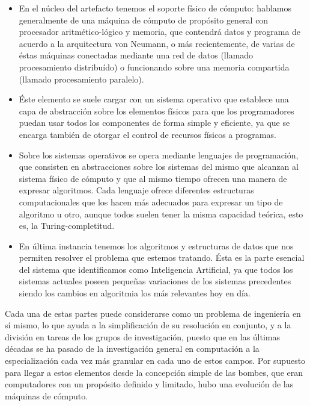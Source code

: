 \documentclass[12pt]{memoir}
\begin{document}
\begin{itemize}
	\item En el núcleo del artefacto tenemos el soporte físico de cómputo: hablamos generalmente de una máquina de cómputo de propósito general con procesador aritmético-lógico y memoria, que contendrá datos y programa de acuerdo a la arquitectura von Neumann, o más recientemente, de varias de éstas máquinas conectadas mediante una red de datos (llamado procesamiento distribuído) o funcionando sobre una memoria compartida (llamado procesamiento paralelo).
	\item Éste elemento se suele cargar con un sistema operativo que establece una capa de abstracción sobre los elementos físicos para que los programadores puedan usar todos los componentes de forma simple y eficiente, ya que se encarga también de otorgar el control de recursos físicos a programas.
	\item Sobre los sistemas operativos se opera mediante lenguajes de programación, que consisten en abstracciones sobre los sistemas del mismo que alcanzan al sistema físico de cómputo y que al mismo tiempo ofrecen una manera de expresar algoritmos. Cada lenguaje ofrece diferentes estructuras computacionales que los hacen más adecuados para expresar un tipo de algoritmo u otro, aunque todos suelen tener la misma capacidad teórica, esto es, la Turing-completitud.
	\item En última instancia tenemos los algoritmos y estructuras de datos que nos permiten resolver el problema que estemos tratando. Ésta es la parte esencial del sistema que identificamos como Inteligencia Artificial, ya que todos los sistemas actuales poseen pequeñas variaciones de los sistemas precedentes siendo los cambios en algoritmia los más relevantes hoy en día.
\end{itemize}

Cada una de estas partes puede considerarse como un problema de ingeniería en sí mismo, lo que ayuda a la simplificación de su resolución en conjunto, y a la división en tareas de los grupos de investigación, puesto que en las últimas décadas se ha pasado de la investigación general en computación a la especialización cada vez más granular en cada uno de estos campos. Por supuesto para llegar a estos elementos desde la concepción simple de las bombes, que eran computadores con un propósito definido y limitado, hubo una evolución de las máquinas de cómputo.

\nocite{wiki:computerhistory}
\end{document}
